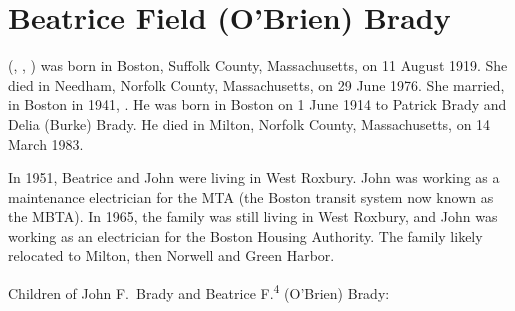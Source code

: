 \section{Beatrice Field (O'Brien) Brady}\label{per:Beatrice4OBrien}

 (, , ) was born in Boston, Suffolk County, Massachusetts, on 11 August 1919.\cite{Beatrice4OBrienBirth} She died in Needham, Norfolk County, Massachusetts, on 29 June 1976.\cite{Beatrice4OBrienDeath} She married, in Boston in 1941, .\cite{Beatrice4OBrienMarriage} He was born in Boston on 1 June 1914 to Patrick Brady and Delia (Burke) Brady.\cite{JohnBradyDraft} He died in Milton, Norfolk County, Massachusetts, on 14 March 1983.\cite{JohnBradyDeath}

In 1951, Beatrice and John were living in West Roxbury. John was working as a maintenance electrician for the MTA (the Boston transit system now known as the MBTA).\cite{JohnBrady1951} In 1965, the family was still living in West Roxbury, and John was working as an electrician for the Boston Housing Authority.\cite{JohnBrady1965} The family likely relocated to Milton, then Norwell and Green Harbor.\cite{Beatrice4OBrienObit}

\begin{KidsIntro}
	Children of John F.\ Brady and Beatrice F.\textsuperscript{4} (O'Brien) Brady:
\end{KidsIntro}

\begin{Kids}
	\KidNum{}{$\bullet$}
	
	\KidNum{}{$\bullet$}
	
	\KidNum{}{$\bullet$}
	
	\KidNum{}{$\bullet$}
\end{Kids}

